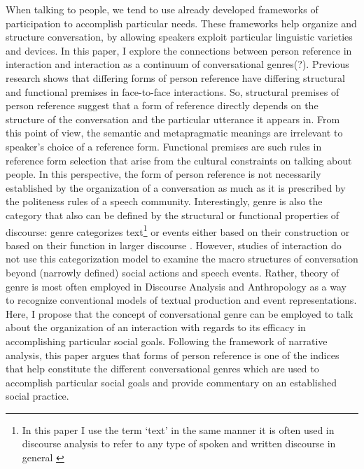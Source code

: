 \documentclass[12pt, draft]{article}
\begin{document}
When talking to people, we tend to use already developed frameworks of participation \autocite{goodwin2005} to accomplish particular needs. These frameworks help organize and structure conversation, by allowing speakers exploit particular linguistic varieties and devices. In this paper, I explore the connections between person reference in interaction and interaction as a continuum of conversational genres(?). Previous research shows that differing forms of person reference have differing structural and functional premises in face-to-face interactions. So, structural premises of person reference suggest that a form of reference directly depends on the structure of the conversation and the particular utterance it appears in. From this point of view, the semantic and metapragmatic meanings are irrelevant to speaker's choice of a reference form. Functional premises are such rules in reference form selection that arise from the cultural constraints on talking about people. In this perspective, the form of person reference is not necessarily established by the organization of a conversation as much as it is prescribed by the politeness rules of a speech community. Interestingly, genre is also the category that also can be defined by the structural or functional properties of discourse: genre categorizes text\footnote{In this paper I use the term `text' in the same manner it is often used in discourse analysis to refer to any type of spoken and written discourse in general \parencite{cameron2014}} or events either based on their construction or based on their function in larger discourse \parencite{georgakopoulou2000, swales1990, briggs1992}. However, studies of interaction do not use this categorization model to examine the macro structures of conversation beyond (narrowly defined) social actions and speech events. Rather, theory of genre is most often employed in Discourse Analysis and Anthropology as a way to recognize conventional models of textual production and event representations. Here, I propose that the concept of conversational genre can be employed to talk about the organization of an interaction with regards to its efficacy in accomplishing particular social goals. Following the \textcite{georgakopoulou2000} framework of narrative analysis, this paper argues that forms of person reference is one of the indices that help constitute the different conversational genres which are used to accomplish particular social goals and provide commentary on an established social practice.
\end{document}
